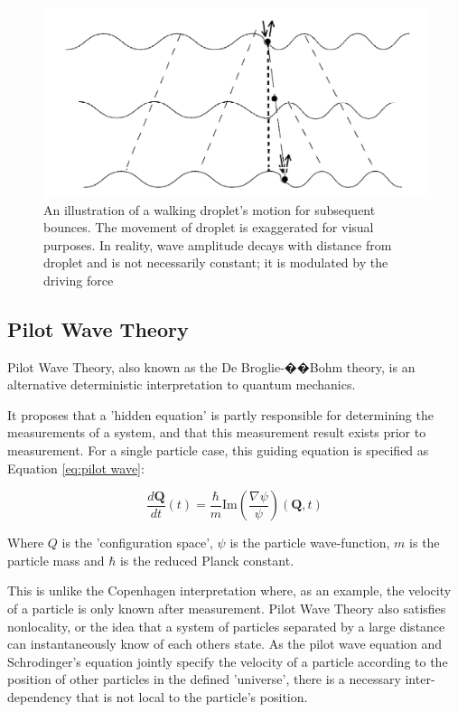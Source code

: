 \begin{figure}[htbp]
\includegraphics[width=12cm]{theory/walkingDroplet}
\centering
\caption{An illustration of a walking droplet's motion for subsequent bounces. The movement of droplet is exaggerated for visual purposes. In reality, wave amplitude decays with distance from droplet and is not necessarily constant; it is modulated by the driving force }
\centering
\label{walker}

\end{figure}

\subsection{Pilot Wave Theory}
Pilot Wave Theory, also known as the De Broglie-��Bohm theory, is an alternative deterministic interpretation to quantum mechanics. 

It proposes that a 'hidden equation' is partly responsible for determining the measurements of a system, and that this measurement result exists prior to measurement. For a single particle case, this guiding equation is specified as Equation \ref{eq:pilot wave}: 

\begin{equation} \label{eq:pilot wave}
\frac{d\mathbf{Q}}{dt}(t) = \frac{\hbar}{m} \mathrm{Im}\left(\frac{\nabla \psi}{\psi}\right)(\mathbf{Q}, t)
\end{equation}


Where $Q$ is the 'configuration space', $\psi$ is the particle wave-function, $m$ is the particle mass and $\hbar$ is the reduced Planck constant. 

This is unlike the Copenhagen interpretation where, as an example, the velocity of a particle is only known after measurement. Pilot Wave Theory also satisfies nonlocality, or the idea that a system of particles separated by a large distance can instantaneously know of each others state. As the pilot wave equation and Schrodinger's equation jointly specify the velocity of a particle according to the position of other particles in the defined 'universe', there is a necessary inter-dependency that is not local to the particle's position. 

